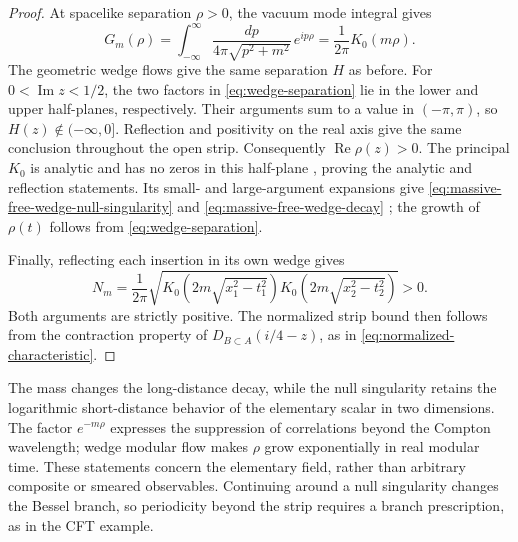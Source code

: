 \documentclass[a4paper,11pt]{article}
\theoremstyle{definition}
\begin{document}
\begin{proof}
At spacelike separation $\rho>0$, the vacuum mode integral gives
\[
 G_m(\rho)=\int_{-\infty}^{\infty}
       \frac{dp}{4\pi\sqrt{p^2+m^2}}\,e^{ip\rho}
       =\frac{1}{2\pi}K_0(m\rho).
\]
The geometric wedge flows give the same separation $H$ as before. For $0<\operatorname{Im}z<1/2$, the two factors in \eqref{eq:wedge-separation} lie in the lower and upper half-planes, respectively. Their arguments sum to a value in $(-\pi,\pi)$, so $H(z)\notin(-\infty,0]$. Reflection and positivity on the real axis give the same conclusion throughout the open strip. Consequently $\operatorname{Re}\rho(z)>0$. The principal $K_0$ is analytic and has no zeros in this half-plane \cite[Section~10.42]{NISTDLMF}, proving the analytic and reflection statements. Its small- and large-argument expansions give \eqref{eq:massive-free-wedge-null-singularity} and \eqref{eq:massive-free-wedge-decay} \cite[Sections~10.31 and~10.40]{NISTDLMF}; the growth of $\rho(t)$ follows from \eqref{eq:wedge-separation}.

Finally, reflecting each insertion in its own wedge gives
\begin{equation}
 N_m=\frac{1}{2\pi}\sqrt{
 K_0\!\left(2m\sqrt{x_1^2-t_1^2}\right)
 K_0\!\left(2m\sqrt{x_2^2-t_2^2}\right)} >0.
 \label{eq:massive-free-wedge-normalization}
\end{equation}
Both arguments are strictly positive. The normalized strip bound then follows from the contraction property of $D_{B\subset A}(i/4-z)$, as in \eqref{eq:normalized-characteristic}.
\end{proof}

The mass changes the long-distance decay, while the null singularity retains the logarithmic short-distance behavior of the elementary scalar in two dimensions. The factor $e^{-m\rho}$ expresses the suppression of correlations beyond the Compton wavelength; wedge modular flow makes $\rho$ grow exponentially in real modular time. These statements concern the elementary field, rather than arbitrary composite or smeared observables. Continuing around a null singularity changes the Bessel branch, so periodicity beyond the strip requires a branch prescription, as in the CFT example.
\end{document}
